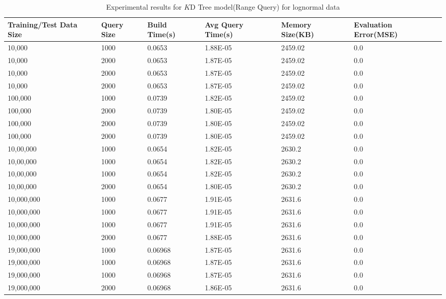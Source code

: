 \begin{table}
	\centering
	\begin{tabular}{||p{}<{\centering}|p{}<{\centering}| p{}<{\centering}|p{}<{\centering}|p{}<{\centering}|p{}<{\centering}||}
		\hline
		Training/Test Data Size & Query Size & Build Time(s) & Avg Query Time(s) & Memory Size(KB) & Evaluation Error(MSE)\\ 
		[0.5ex] 
        \hline
		\hline
		10,000& 1000 & 0.0653 & 1.88E-05 & 2459.02&0.0\\
		\hline
		10,000& 2000 & 0.0653 & 1.87E-05 & 2459.02& 0.0\\
		\hline
		10,000& 2000 & 0.0653 & 1.87E-05 & 2459.02& 0.0\\
		\hline
		10,000& 2000 & 0.0653 & 1.87E-05 & 2459.02& 0.0\\
		\hline
		100,000& 1000 & 0.0739 & 1.82E-05 & 2459.02& 0.0\\
		\hline
		100,000& 2000 & 0.0739 & 1.80E-05 & 2459.02& 0.0\\
		\hline
		100,000& 2000 & 0.0739 & 1.80E-05 & 2459.02& 0.0\\
		\hline
		100,000& 2000 & 0.0739 & 1.80E-05 & 2459.02& 0.0\\
		\hline
		10,00,000& 1000 & 0.0654 & 1.82E-05 & 2630.2& 0.0\\
		\hline
		10,00,000& 1000 & 0.0654 & 1.82E-05 & 2630.2& 0.0\\
		\hline
		10,00,000& 1000 & 0.0654 & 1.82E-05 & 2630.2& 0.0\\
		\hline
		10,00,000& 2000 & 0.0654 & 1.80E-05 & 2630.2& 0.0\\
		\hline 
		10,000,000& 1000 & 0.0677 & 1.91E-05 & 2631.6& 0.0\\
		\hline
		10,000,000& 1000 & 0.0677 & 1.91E-05 & 2631.6& 0.0\\
		\hline
		10,000,000& 1000 & 0.0677 & 1.91E-05 & 2631.6& 0.0\\
		\hline
		10,000,000& 2000 &0.0677 & 1.88E-05 & 2631.6& 0.0\\
		\hline
		19,000,000& 1000 & 0.06968 & 1.87E-05 & 2631.6& 0.0\\
		\hline
		19,000,000& 1000 & 0.06968 & 1.87E-05 & 2631.6& 0.0\\
		\hline
		19,000,000& 1000 & 0.06968 & 1.87E-05 & 2631.6& 0.0\\
		\hline
		19,000,000& 2000 & 0.06968 & 1.86E-05 & 2631.6& 0.0\\
        \hline
		\hline
	\end{tabular}
    \label{lognormal_KD_Tree_Range_Query}
	\caption{Experimental results for $K$D Tree model(Range Query) for lognormal data}
\end{table}

